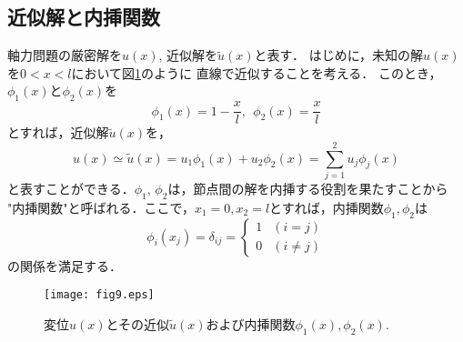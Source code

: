 \documentclass[10pt,a4j]{jarticle}
\begin{document}
\subsection{近似解と内挿関数}
軸力問題の厳密解を$u(x)$, 近似解を$\tilde u(x)$と表す．
はじめに，未知の解$u(x)$を$0<x<l$において図\ref{fig:fig9}のように
直線で近似することを考える．
このとき，$\phi_1(x)$と$\phi_2(x)$を
\begin{equation}
	\phi_1(x)= 1-\frac{x}{l}, \ \ 
	\phi_2(x)= \frac{x}{l}
	\label{eqn:basis}
\end{equation}
とすれば，近似解$\tilde u(x)$を，
\begin{equation}
	u(x)\simeq \tilde u (x)=u_1\phi_1(x)+ u_2\phi_2(x)=\sum_{j=1}^2u_j\phi_j(x)
	\label{eqn:u_tilde}
\end{equation}
と表すことができる．$\phi_1,\, \phi_2$は，節点間の解を内挿する役割を果たすことから
"内挿関数"と呼ばれる．ここで，$x_1=0, x_2=l$とすれば，内挿関数$\phi_1,\phi_2$は
\begin{equation}
	\phi_i(x_j)=\delta_{ij}
	=\left\{
	\begin{array}{cc}
		1 & (i=j)  \\
		0 & (i\neq j) 
	\end{array}
		\right.
	\label{eqn:phi_01}
\end{equation}
の関係を満足する．
\begin{figure}[h]
	\begin{center}
	\texttt{[image: fig9.eps]} 
	\end{center}
	\caption{変位$u(x)$とその近似$\tilde u(x)$および内挿関数$\phi_1(x),\phi_2(x)$.} 
	\label{fig:fig9}
\end{figure}
\end{document}
